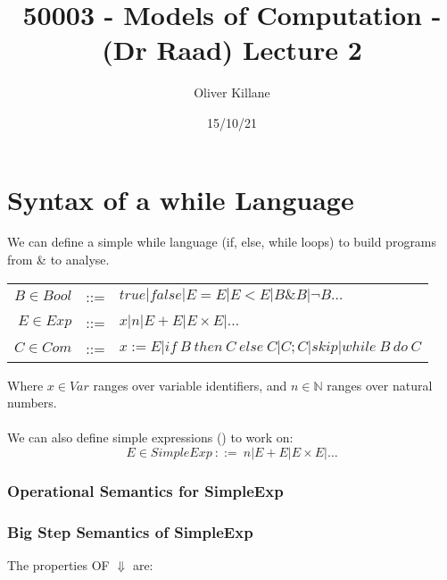 \documentclass{report}
\title{50003 - Models of Computation - (Dr Raad) Lecture 2}
\author{Oliver Killane}
\date{15/10/21}
\begin{document}
    \maketitle

    \section*{Syntax of a while Language}
        We can define a simple while language (if, else, while loops) to build programs from \& to analyse.
        \begin{center}
            \begin{tabular}{r c l}
                $B \in Bool$ & ::= & $true | false | E = E | E < E | B \& B | \neg B \dots$ \\
                $E \in Exp$ & ::= & $x | n | E + E | E \times E | \dots$ \\
                $C \in Com$ & ::= & $x :=E | if \ B \ then \ C \ else \ C | C;C | skip | while \ B \ do \ C$ \\
            \end{tabular}
        \end{center}
        Where $x \in Var$ ranges over variable identifiers, and $n \in \mathbb{N}$ ranges over natural numbers.
        \\
        \\ We can also define simple expressions () to work on:
        \[E \in SimpleExp \ ::= \ n | E + E | E \times E | \dots\]
        \subsubsection*{Operational Semantics for SimpleExp}
            \begin{itemize}
            \end{itemize}
        \subsubsection*{Big Step Semantics of SimpleExp}
            The properties OF $\Downarrow$ are:
            \begin{itemize}
            \end{itemize}
\end{document}
